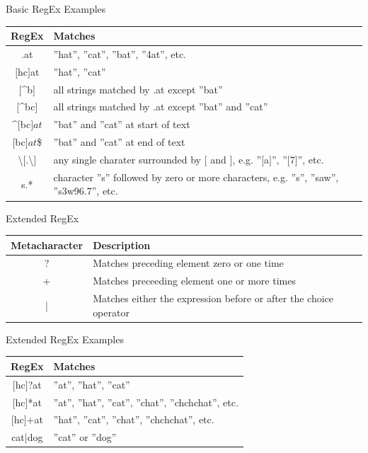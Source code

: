 \documentclass[ignorenonframetext,xcolor=x11names]{beamer}
\begin{document}
\begin{frame}[label=advanced]{Basic RegEx Examples}
\footnotesize
\renewcommand{\arraystretch}{1.5}

\begin{tabularx}{\textwidth}{c|X} \hline
{\bf RegEx} & {\bf Matches} \\ \hline \hline
.at & ''hat'', ''cat'', ''bat'', ''4at'', etc. \\ \hline
$[$hc$]$at & ''hat'', ''cat'' \\ \hline
$[$\^{ }b$]$ & all strings matched by .at except ''bat'' \\ \hline
$[$\^{ }bc$]$ & all strings matched by .at except ''bat'' and ''cat'' \\ \hline
\^{ }$[$bc$]at$ & ''bat'' and ''cat'' at start of text \\ \hline
$[$bc$]at$\$ & ''bat'' and ''cat'' at end of text \\ \hline
\textbackslash $[$.\textbackslash$]$ & any single charater surrounded by $[$ and $]$, e.g. ''$[$a$]$'', ''$[$7$]$'', etc. \\ \hline
s.* & character ''s'' followed by zero or more characters, e.g. ''s'', ''saw'', ''s3w96.7'', etc. \\ \hline
\end{tabularx}
\end{frame}

\begin{frame}[label=advanced]{Extended RegEx}
\footnotesize
\renewcommand{\arraystretch}{1.5}
\begin{tabularx}{\textwidth}{c|X} \hline
{\bf Metacharacter} & {\bf Description} \\ \hline \hline
? & Matches preceding element zero or one time \\ \hline
+ & Matches preceeding element one or more times \\ \hline
| & Matches either the expression before or after the choice operator \\ \hline
\end{tabularx}
\end{frame}

\begin{frame}[label=advanced]{Extended RegEx Examples}
\footnotesize
\renewcommand{\arraystretch}{1.5}

\begin{tabularx}{\textwidth}{c|X} \hline
{\bf RegEx} & {\bf Matches} \\ \hline \hline
$[$hc$]$?at & ''at'', ''hat'', ''cat'' \\ \hline
$[$hc$]$*at & ''at'', ''hat'', ''cat'', ''chat'', ''chchchat'', etc. \\ \hline
$[$hc$]$+at & ''hat'', ''cat'', ''chat'', ''chchchat'', etc. \\ \hline
cat|dog & ''cat'' or ''dog'' \\ \hline
\end{tabularx}
\end{frame}
\end{document}
